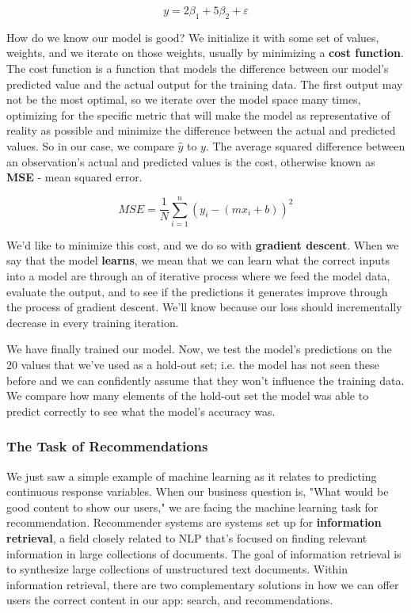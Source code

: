 \documentclass[11pt, table]{diazessay} %
\begin{document}
\begin{sloppypar}
\begin{equation}
y = 2\beta_1 + 5\beta_2 + \varepsilon
\end{equation}

How do we know our model is good? We initialize it with some set of values, weights, and we iterate on those weights, usually by minimizing a \textbf{cost function}. The cost function is a function that models the difference between our model's predicted value and the actual output for the training data. The first output may not be the most optimal, so we iterate over the model space many times, optimizing for the specific metric that will make the model as representative of reality as possible and minimize the difference between the actual and predicted values. So in our case, we compare $\hat{y}$ to $y$. The average squared difference between an observation’s actual and predicted values is the cost, otherwise known as \textbf{MSE} - mean squared error.

\begin{equation}
MSE =  \frac{1}{N} \sum_{i=1}^{n} (y_i - (m x_i + b))^2
\end{equation}

We'd like to minimize this cost, and we do so with \textbf{gradient descent}. When we say that the model \textbf{learns}, we mean that we can learn what the correct inputs into a model are through an of iterative process where we feed the model data, evaluate the output, and to see if the predictions it generates improve through the process of gradient descent. We'll know because our loss should incrementally decrease in every training iteration.

We have finally trained our model. Now, we test the model's predictions on the 20 values that we've used as a hold-out set; i.e. the model has not seen these before and we can confidently assume that they won't influence the training data. We compare how many elements of the hold-out set the model was able to predict correctly to see what the model's accuracy was.

\subsubsection{The Task of Recommendations}

We just saw a simple example of machine learning as it relates to predicting continuous response variables. When our business question is, "What would be good content to show our users," we are facing the machine learning task for recommendation. Recommender systems are systems set up for \textbf{information retrieval}, a field closely related to NLP that's focused on finding relevant information in large collections of documents.  The goal of information retrieval is to synthesize large collections of unstructured text documents. Within information retrieval, there are two complementary solutions in how we can offer users the correct content in our app: search, and recommendations.


\end{sloppypar}
\end{document}

